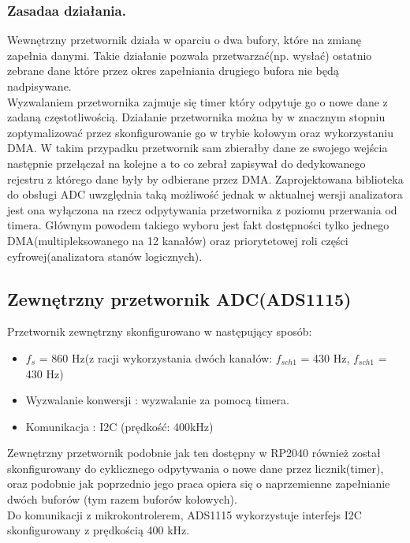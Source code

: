 \subsubsection{Zasadaa działania.}
Wewnętrzny przetwornik działa w oparciu o dwa bufory, które na zmianę zapełnia danymi. Takie 
działanie pozwala przetwarzać(np. wysłać) ostatnio zebrane dane które przez okres 
zapełniania drugiego bufora nie będą nadpisywane.\\
\indent Wyzwalaniem przetwornika zajmuje się timer który odpytuje go o nowe dane z zadaną częstotliwością.
Działanie przetwornika można by w znacznym stopniu zoptymalizować przez skonfigurowanie go w 
trybie kołowym oraz wykorzystaniu DMA. W takim przypadku przetwornik sam zbierałby dane ze swojego
wejścia następnie przełączał na kolejne a to co zebrał zapisywał do dedykowanego rejestru z którego dane
były by odbierane przez DMA. Zaprojektowana biblioteka do obsługi ADC uwzględnia taką możliwość
jednak w aktualnej wersji analizatora jest ona wyłączona na rzecz odpytywania przetwornika z poziomu
przerwania od timera. Głównym powodem takiego wyboru jest fakt dostępności tylko jednego 
DMA(multipleksowanego na 12 kanałów) oraz priorytetowej roli części cyfrowej(analizatora stanów
logicznych).


\subsection{Zewnętrzny przetwornik ADC(ADS1115)}
Przetwornik zewnętrzny skonfigurowano w następujący sposób:
\begin{itemize}
    \item $f_{s}$ = 860 Hz(z racji wykorzystania dwóch kanałów: $f_{sch1}$ = 430 Hz, $f_{sch1}$ = 430 Hz)
    \item Wyzwalanie konwersji : wyzwalanie za pomocą timera. 
    \item Komunikacja : I2C (prędkość: 400kHz)
\end{itemize}

\indent Zewnętrzny przetwornik podobnie jak ten dostępny w RP2040 również został skonfigurowany do cyklicznego 
odpytywania o nowe dane przez licznik(timer), oraz podobnie jak poprzednio jego praca opiera się o 
naprzemienne zapełnianie dwóch buforów (tym razem buforów kołowych). \\
\indent Do komunikacji z mikrokontrolerem, ADS1115 wykorzystuje interfejs I2C skonfigurowany
z prędkością 400 kHz.

